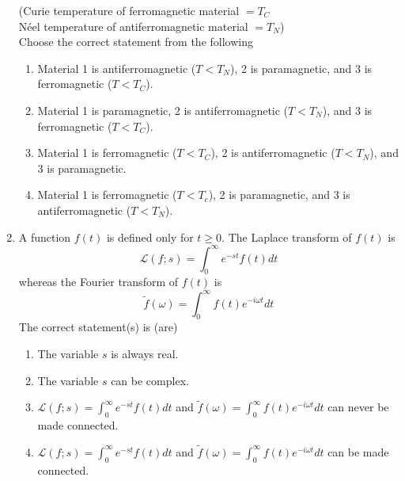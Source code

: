 \documentclass[journal]{IEEEtran}
\begin{document}
\begin{enumerate}


(Curie temperature of ferromagnetic material $=T_C$ \\ N\'eel temperature of antiferromagnetic material $=T_N$) \\ Choose the correct statement from the following

\begin{enumerate}
\item Material 1 is antiferromagnetic ($T<T_N$), 2 is paramagnetic, and 3 is ferromagnetic ($T<T_C$).
\item Material 1 is paramagnetic, 2 is antiferromagnetic ($T<T_N$), and 3 is ferromagnetic ($T<T_C$).
\item Material 1 is ferromagnetic ($T<T_C$), 2 is antiferromagnetic ($T<T_N$), and 3 is paramagnetic.
\item Material 1 is ferromagnetic ($T<T_c$), 2 is paramagnetic, and 3 is antiferromagnetic ($T<T_N$).
\end{enumerate}

\item A function $f(t)$ is defined only for $t\geq0$. The Laplace transform of $f(t)$ is $$\mathcal{L}(f;s)=\int_0^\infty e^{-st}f(t) dt$$ whereas the Fourier transform of $f(t)$ is $$\tilde{f}(\omega)=\int_0^\infty f(t)e^{-i\omega t}dt$$ The correct statement(s) is (are)

\begin{enumerate}
\item The variable $s$ is always real.
\item The variable $s$ can be complex.
\item $\mathcal{L}(f;s)=\int_0^\infty e^{-st}f(t) dt$ and $\tilde{f}(\omega)=\int_0^\infty f(t)e^{-i\omega t}dt$ can never be made connected.
\item $\mathcal{L}(f;s)=\int_0^\infty e^{-st}f(t) dt$ and $\tilde{f}(\omega)=\int_0^\infty f(t)e^{-i\omega t}dt$ can be made connected.
\end{enumerate}

\end{enumerate}
\end{document}

